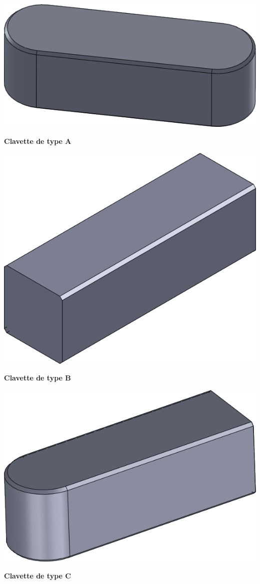 \documentclass[11pt,oneside]{article}
\begin{document}
\noindent\begin{minipage}[c]{.22\linewidth}
\begin{center}
\includegraphics[width=.6\textwidth]{png/clavettea}

\textbf{Clavette de type A}
\end{center}
\end{minipage}\hfill
\begin{minipage}[c]{.22\linewidth}
\begin{center}
\includegraphics[width=.6\textwidth]{png/clavetteb}

\textbf{Clavette de type B}
\end{center}
\end{minipage}\hfill
\begin{minipage}[c]{.22\linewidth}
\begin{center}
\includegraphics[width=.6\textwidth]{png/clavettec}

\textbf{Clavette de type C}
\end{center}
\end{minipage}\hfill
\end{document}
